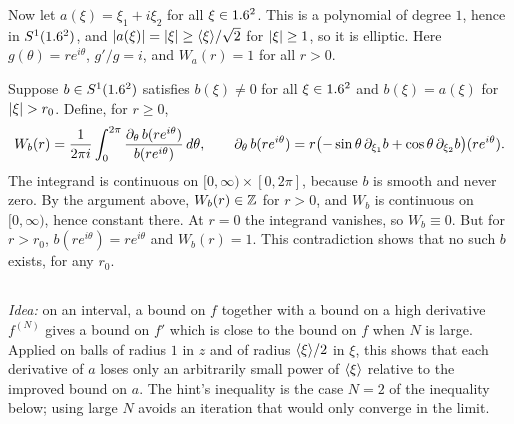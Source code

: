 Now let $a(\xi)=\xi_1+i\xi_2$ for all $\xi\in1.6^2$. This is a polynomial of degree $1$,
hence in $S^1(1.6^2)$, and $\lvert a(\xi)\rvert=\lvert \xi\rvert\ge\langle \xi\rangle/\sqrt2$ for $\lvert \xi\rvert\ge1$, so it
is elliptic. Here $g(\theta)=re^{i\theta}$, $g'/g=i$, and $W_a(r)=1$ for all $r>0$.

Suppose $b\in S^1(1.6^2)$ satisfies $b(\xi)\ne0$ for all $\xi\in1.6^2$ and $b(\xi)=a(\xi)$
for $\lvert \xi\rvert>r_0$. Define, for $r\ge0$,
\begin{equation*}
  W_b(r)=\frac1{2\pi i}\int_0^{2\pi}\frac{\partial_\theta\, b(re^{i\theta})}{b(re^{i\theta})}\,d\theta,
  \qquad \partial_\theta\,b(re^{i\theta})=r\bigl(-\sin\theta\,\partial_{\xi_1}b+\cos\theta\,\partial_{\xi_2}b\bigr)(re^{i\theta}).
\end{equation*}
The integrand is continuous on $[0,\infty)\times[0,2\pi]$, because $b$ is smooth and
never zero. By the argument above, $W_b(r)\in\mathbb{Z}$ for $r>0$, and $W_b$ is continuous on
$[0,\infty)$, hence constant there. At $r=0$ the integrand vanishes, so $W_b\equiv0$. But
for $r>r_0$, $b(re^{i\theta})=re^{i\theta}$ and $W_b(r)=1$. This contradiction shows that
no such $b$ exists, for any $r_0$.

\subsection*{}

\emph{Idea:} on an interval, a bound on $f$ together with a bound on a high derivative
$f^{(N)}$ gives a bound on $f'$ which is close to the bound on $f$ when $N$ is large.
Applied on balls of radius $1$ in $z$ and of radius $\langle \xi\rangle/2$ in $\xi$, this shows that
each derivative of $a$ loses only an arbitrarily small power of $\langle \xi\rangle$ relative to the
improved bound on $a$. The hint's inequality is the case $N=2$ of the inequality below;
using large $N$ avoids an iteration that would only converge in the limit.

